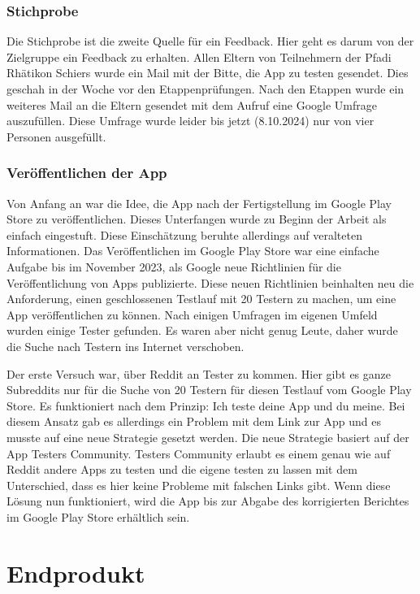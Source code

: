 \subsubsection{Stichprobe}

Die Stichprobe ist die zweite Quelle für ein Feedback. Hier geht es darum von der Zielgruppe ein Feedback zu erhalten. Allen Eltern von Teilnehmern der Pfadi Rhätikon Schiers wurde ein Mail mit der Bitte, die App zu testen gesendet. Dies geschah in der Woche vor den Etappenprüfungen. Nach den Etappen wurde ein weiteres Mail an die Eltern gesendet mit dem Aufruf eine Google Umfrage auszufüllen. Diese Umfrage wurde leider bis jetzt (8.10.2024) nur von vier Personen ausgefüllt.

\subsubsection{Veröffentlichen der App}

Von Anfang an war die Idee, die App nach der Fertigstellung im Google Play Store zu veröffentlichen. Dieses Unterfangen wurde zu Beginn der Arbeit als einfach eingestuft. Diese Einschätzung beruhte allerdings auf veralteten Informationen. Das Veröffentlichen im Google Play Store war eine einfache Aufgabe bis im November 2023, als Google neue Richtlinien für die Veröffentlichung von Apps publizierte. Diese neuen Richtlinien beinhalten neu die Anforderung, einen geschlossenen Testlauf mit 20 Testern zu machen, um eine App veröffentlichen zu können. Nach einigen Umfragen im eigenen Umfeld wurden einige Tester gefunden. Es waren aber nicht genug Leute, daher wurde die Suche nach Testern ins Internet verschoben. \par
Der erste Versuch war, über Reddit an Tester zu kommen. Hier gibt es ganze Subreddits nur für die Suche von 20 Testern für diesen Testlauf vom Google Play Store. Es funktioniert nach dem Prinzip: Ich teste deine App und du meine. Bei diesem Ansatz gab es allerdings ein Problem mit dem Link zur App und es musste auf eine neue Strategie gesetzt werden. Die neue Strategie basiert auf der App Testers Community. Testers Community erlaubt es einem genau wie auf Reddit andere Apps zu testen und die eigene testen zu lassen mit dem Unterschied, dass es hier keine Probleme mit falschen Links gibt. Wenn diese Lösung nun funktioniert, wird die App bis zur Abgabe des korrigierten Berichtes im Google Play Store erhältlich sein.

\newpage

\section{Endprodukt}

